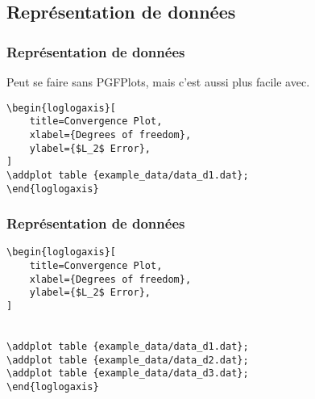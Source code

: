 \documentclass{clic_latex_beamer}
\begin{document}
\subsection{Représentation de données}
\begin{frame}[fragile]
\frametitle{Représentation de données}
Peut se faire sans PGFPlots, mais c'est aussi plus facile avec.

\pause

\begin{multicols}{2}

\columnbreak

\begin{lstlisting}
\begin{loglogaxis}[
    title=Convergence Plot,
    xlabel={Degrees of freedom},
    ylabel={$L_2$ Error},
]
\addplot table {example_data/data_d1.dat};
\end{loglogaxis}
\end{lstlisting}

\end{multicols}

\end{frame}

\begin{frame}[fragile]
\frametitle{Représentation de données}
\begin{multicols}{2}

\columnbreak

\begin{lstlisting}
\begin{loglogaxis}[
    title=Convergence Plot,
    xlabel={Degrees of freedom},
    ylabel={$L_2$ Error},
]


\addplot table {example_data/data_d1.dat};
\addplot table {example_data/data_d2.dat};
\addplot table {example_data/data_d3.dat};
\end{loglogaxis}
\end{lstlisting}

\end{multicols}

\end{frame}
\end{document}
